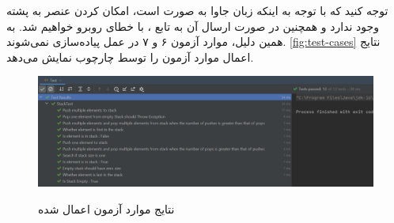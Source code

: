 \documentclass[twoside]{article}
\newenvironment{answer}{}{\medskip}
\begin{document}
\begin{answer}
توجه کنید که با توجه به اینکه زبان جاوا به صورت  است، امکان  کردن عنصر  به پشته وجود ندارد و همچنین در صورت ارسال آن به تابع ، با خطای  روبرو خواهیم شد. به همین دلیل، موارد آزمون ۶ و ۷ در عمل پیاده‌سازی نمی‌شوند. \autoref{fig:test-cases} نتایج اعمال موارد آزمون را توسط چارچوب  نمایش می‌دهد.

\begin{figure}
	\caption{نتایج موارد آزمون اعمال شده}
	\includegraphics[width=\textwidth]{test-status-q3}
	\label{fig:test-cases}
\end{figure}
\end{answer}
\end{document}
